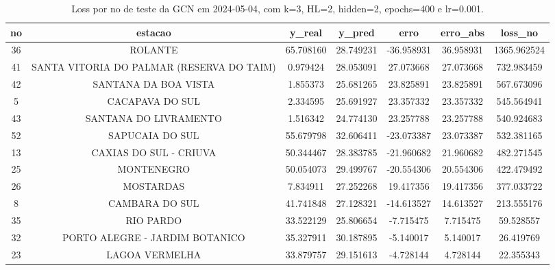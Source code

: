\begin{table}[h]
\centering
\caption{Loss por no de teste da GCN em 2024-05-04, com k=3, HL=2, hidden=2, epochs=400 e lr=0.001.}
\label{tab:gcn_loss_k3_hl2_h2_e400_d20240504}
\begin{tabular}{ccccccc}
\toprule
no & estacao & y\_real & y\_pred & erro & erro\_abs & loss\_no \\
\midrule
36 & ROLANTE & 65.708160 & 28.749231 & -36.958931 & 36.958931 & 1365.962524 \\
41 & SANTA VITORIA DO PALMAR (RESERVA DO TAIM) & 0.979424 & 28.053091 & 27.073668 & 27.073668 & 732.983459 \\
42 & SANTANA DA BOA VISTA & 1.855373 & 25.681265 & 23.825891 & 23.825891 & 567.673096 \\
5 & CACAPAVA DO SUL & 2.334595 & 25.691927 & 23.357332 & 23.357332 & 545.564941 \\
43 & SANTANA DO LIVRAMENTO & 1.516342 & 24.774130 & 23.257788 & 23.257788 & 540.924683 \\
52 & SAPUCAIA DO SUL & 55.679798 & 32.606411 & -23.073387 & 23.073387 & 532.381165 \\
13 & CAXIAS DO SUL - CRIUVA & 50.344467 & 28.383785 & -21.960682 & 21.960682 & 482.271545 \\
25 & MONTENEGRO & 50.054073 & 29.499767 & -20.554306 & 20.554306 & 422.479492 \\
26 & MOSTARDAS & 7.834911 & 27.252268 & 19.417356 & 19.417356 & 377.033722 \\
8 & CAMBARA DO SUL & 41.741848 & 27.128321 & -14.613527 & 14.613527 & 213.555176 \\
35 & RIO PARDO & 33.522129 & 25.806654 & -7.715475 & 7.715475 & 59.528557 \\
32 & PORTO ALEGRE - JARDIM BOTANICO & 35.327911 & 30.187895 & -5.140017 & 5.140017 & 26.419769 \\
23 & LAGOA VERMELHA & 33.879757 & 29.151613 & -4.728144 & 4.728144 & 22.355343 \\
\bottomrule
\end{tabular}
\end{table}
